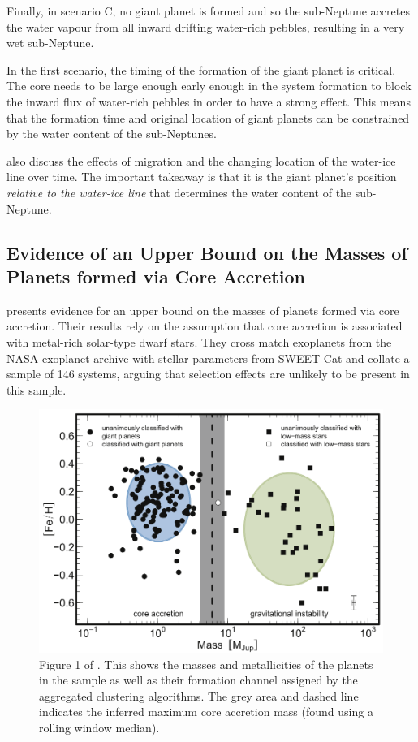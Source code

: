 \documentclass[twocolumn]{aastex631}
\begin{document}
Finally, in scenario C, no giant planet is formed and so the sub-Neptune accretes the water vapour from all inward drifting water-rich pebbles, resulting in a very wet sub-Neptune.

In the first scenario, the timing of the formation of the giant planet is critical. The core needs to be large enough early enough in the system formation to block the inward flux of water-rich pebbles in order to have a strong effect. This means that the formation time and original location of giant planets can be constrained by the water content of the sub-Neptunes.

\citet{Bitsch+2021} also discuss the effects of migration and the changing location of the water-ice line over time. The important takeaway is that it is the giant planet's position \textit{relative to the water-ice line} that determines the water content of the sub-Neptune.

\subsection{Evidence of an Upper Bound on the Masses of Planets formed via Core Accretion}

\citet{Schlaufman+2018} presents evidence for an upper bound on the masses of planets formed via core accretion. Their results rely on the assumption that core accretion is associated with metal-rich solar-type dwarf stars. They cross match exoplanets from the NASA exoplanet archive with stellar parameters from SWEET-Cat and collate a sample of 146 systems, arguing that selection effects are unlikely to be present in this sample.

\begin{figure}[htb]
    \centering
    \includegraphics[width=\columnwidth]{max_core_acc_mass.png}
    \caption{Figure 1 of \citet{Schlaufman+2018}. This shows the masses and metallicities of the planets in the sample as well as their formation channel assigned by the aggregated clustering algorithms. The grey area and dashed line indicates the inferred maximum core accretion mass (found using a rolling window median).}
    \label{fig:max_mass}
\end{figure}
\end{document}
